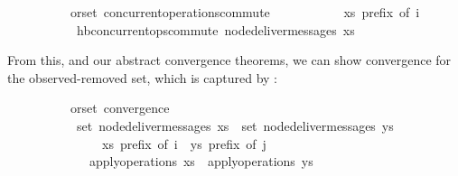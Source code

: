 \vspace{0.375em}
\begin{isabellebody}
\ \ \ \ \ \ \ \ \ {\isacharparenleft}\ orset{\isacharparenright}\ concurrent{\isacharunderscore}operations{\isacharunderscore}commute{\isacharcolon}\isanewline
\ \ \ \ \ \ \ \ \ \ \ {\isachardoublequoteopen}xs\ prefix\ of\ i{\isachardoublequoteclose}\isanewline
\ \ \ \ \ \ \ \ \ \ \ {\isachardoublequoteopen}hb{\isachardot}concurrent{\isacharunderscore}ops{\isacharunderscore}commute\ {\isacharparenleft}node{\isacharunderscore}deliver{\isacharunderscore}messages\ xs{\isacharparenright}{\isachardoublequoteclose}
\end{isabellebody}
\vspace{0.375em}
From this, and our abstract convergence theorems, we can show convergence for the observed-removed set, which is captured by : 
\vspace{0.375em}
\begin{isabellebody}
\ \ \ \ \ \ \ \ \ {\isacharparenleft}\ orset{\isacharparenright}\ convergence{\isacharcolon}\isanewline
\ \ \ \ \ \ \ \ \ \ \ {\isachardoublequoteopen}set\ {\isacharparenleft}node{\isacharunderscore}deliver{\isacharunderscore}messages\ xs{\isacharparenright}\ {\isacharequal}\ set\ {\isacharparenleft}node{\isacharunderscore}deliver{\isacharunderscore}messages\ ys{\isacharparenright}{\isachardoublequoteclose}\isanewline
\ \ \ \ \ \ \ \ \ \ \ \ \ \ \ {\isachardoublequoteopen}xs\ prefix\ of\ i{\isachardoublequoteclose}\ \ {\isachardoublequoteopen}ys\ prefix\ of\ j{\isachardoublequoteclose}\isanewline
\ \ \ \ \ \ \ \ \ \ \ \ \ {\isachardoublequoteopen}apply{\isacharunderscore}operations\ xs\ {\isacharequal}\ apply{\isacharunderscore}operations\ ys{\isachardoublequoteclose}
\end{isabellebody}